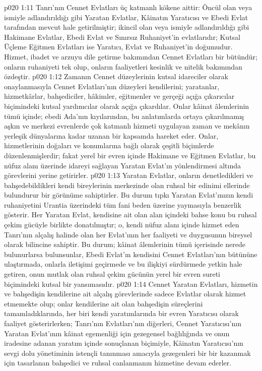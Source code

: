 \vs p020 1:11 Tanrı’nın Cennet Evlatları üç katmanlı kökene aittir: Öncül olan veya ismiyle adlandırıldığı gibi Yaratan Evlatlar, Kâinatın Yaratıcısı ve Ebedi Evlat tarafından mevcut hale getirilmiştir; ikincil olan veya ismiyle adlandırıldığı gibi Hakimane Evlatlar, Ebedi Evlat ve Sınırsız Ruhaniyet’in evlatlarıdır; Kutsal Üçleme Eğitmen Evlatları ise Yaratıcı, Evlat ve Ruhaniyet’in doğumudur. Hizmet, ibadet ve arzuyu dile getirme bakımından Cennet Evlatları bir bütündür; onların ruhaniyeti tek olup, onların faaliyetleri kesinlik ve nitelik bakımından özdeştir.
\vs p020 1:12 Zamanın Cennet düzeylerinin kutsal idareciler olarak onaylanmasıyla Cennet Evlatları’nın düzeyleri kendilerini; yaratanlar, hizmetkârlar, bahşediciler, hâkimler, eğitmenler ve gerçeği açığa çıkarıcılar biçimindeki kutsal yardımcılar olarak açığa çıkardılar. Onlar kâinat âlemlerinin tümü içinde; ebedi Ada’nın kıyılarından, bu anlatımlarda ortaya çıkarılmamış aşkın ve merkezi evrenlerde çok katmanlı hizmeti uygulayan zaman ve mekânın yerleşik dünyalarına kadar uzanan bir kapsamda hareket eder. Onlar, hizmetlerinin doğaları ve konumlarına bağlı olarak çeşitli biçimlerde düzenlenmişlerdir; fakat yerel bir evren içinde Hakimane ve Eğitmen Evlatlar, bu nüfuz alanı üzerinde idareyi sağlayan Yaratan Evlat’ın yönlendirmesi altında görevlerini yerine getirirler.
\vs p020 1:13 Yaratan Evlatlar, onların denetledikleri ve bahşedebildikleri kendi bireylerinin merkezinde olan ruhsal bir edinimi ellerinde bulundurur bir görünüme sahiptirler. Bu durum tıpkı Yaratan Evlat’ınızın kendi ruhaniyetini Urantia üzerindeki tüm fani beden üzerine yaymasıyla benzerlik gösterir. Her Yaratan Evlat, kendisine ait olan alan içindeki bahse konu bu ruhsal çekim gücüyle birlikte donatılmıştır; o, kendi nüfuz alanı içinde hizmet eden Tanrı’nın alçalış halinde olan her Evlat’ının her faaliyeti ve duygusunun bireysel olarak bilincine sahiptir. Bu durum; kâinat âlemlerinin tümü içerisinde nerede bulunurlarsa bulunsunlar, Ebedi Evlat’ın kendisini Cennet Evlatları’nın bütününe ulaştırmada, onlarla iletişimi geçirmede ve bu ilişkiyi sürdürmede yetkin hale getiren, onun mutlak olan ruhsal çekim gücünün yerel bir evren sureti biçimindeki kutsal bir yansımasıdır.
\vs p020 1:14 Cennet Yaratan Evlatları, hizmetin ve bahşedişin kendilerine ait alçalış görevlerinde sadece Evlatlar olarak hizmet etmemekte olup; onlar kendilerine ait olan bahşedişin süreçlerini tamamladıklarında, her biri kendi yaratımlarında bir evren Yaratıcısı olarak faaliyet gösterirlerken; Tanrı’nın Evlatları’nın diğerleri, Cennet Yaratıcısı’nın Yaratan Evlat’ının kâinat egemenliği için gezegensel bağlılığında ve onun iradesine adanan yaratım içinde sonuçlanan biçimiyle, Kâinatın Yaratıcısı’nın sevgi dolu yönetiminin istençli tanınması amacıyla gezegenleri bir bir kazanmak için tasarlanan bahşedici ve ruhsal canlanmanın hizmetine devam ederler.
